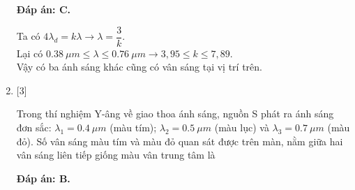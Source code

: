 \begin{enumerate}[label=\bfseries Câu \arabic*:]
	\loigiai
	{		\textbf{Đáp án: C.}
		
		Ta có $4\lambda_{d} = k\lambda \rightarrow \lambda = \dfrac{3}{k}$. \\
		Lại có $\SI{0,38}{\mu m} \leq \lambda \leq \SI{0,76}{\mu m} \rightarrow 3,95 \leq k \leq 7,89$.  \\
		Vậy có ba ánh sáng khác cũng có vân sáng tại vị trí trên.
	}
	
	\item {} [3]
	\cauhoi
	{Trong thí nghiệm Y-âng về giao thoa ánh sáng, nguồn S phát ra ánh sáng đơn sắc: $\lambda_{1} = \SI{0,4}{\mu m}$ (màu tím); $\lambda_{2} = \SI{0,5}{\mu m}$ (màu lục) và $\lambda_{3} = \SI{0,7}{\mu m}$ (màu đỏ). Số vân sáng màu tím và màu đỏ quan sát được trên màn, nằm giữa hai vân sáng liên tiếp giống màu vân trung tâm là
	}
	
	\loigiai
	{		\textbf{Đáp án: B.}
		
}
\end{enumerate}
